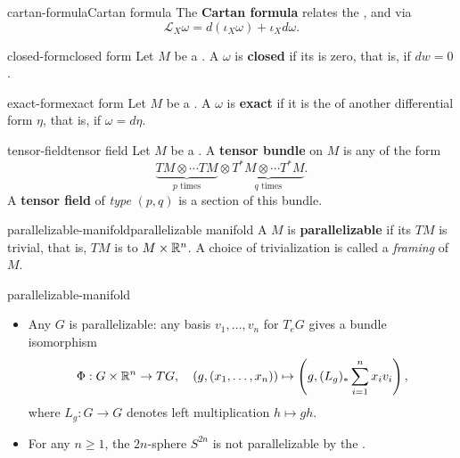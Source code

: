 \begin{topic}{cartan-formula}{Cartan formula}
    The \textbf{Cartan formula} relates the ,  and  via
    \[ \mathcal{L}_X \omega = d(\iota_X \omega) + \iota_X d \omega . \]
\end{topic}

\begin{topic}{closed-form}{closed form}
    Let $M$ be a . A  $\omega$ is \textbf{closed} if its  is zero, that is, if $dw = 0$.
\end{topic}

\begin{topic}{exact-form}{exact form}
    Let $M$ be a . A  $\omega$ is \textbf{exact} if it is the  of another differential form $\eta$, that is, if $\omega = d \eta$.
\end{topic}

\begin{topic}{tensor-field}{tensor field}
    Let $M$ be a . A \textbf{tensor bundle} on $M$ is any  of the form
    \[ \underbrace{TM \otimes \cdots TM}_{p \text{ times}} \otimes \underbrace{T^*M \otimes \cdots T^*M}_{q \text{ times}} . \]
    A \textbf{tensor field} of \textit{type} $(p, q)$ is a section of this bundle.
\end{topic}

\begin{topic}{parallelizable-manifold}{parallelizable manifold}
    A  $M$ is \textbf{parallelizable} if its  $TM$ is trivial, that is, $TM$ is  to $M \times \mathbb{R}^n$. A choice of trivialization is called a \textit{framing} of $M$.
\end{topic}

\begin{example}{parallelizable-manifold}
    \begin{itemize}
        \item Any  $G$ is parallelizable: any basis $v_1, \ldots, v_n$ for $T_e G$ gives a bundle isomorphism
        \[ \Phi : G \times \mathbb{R}^n \to TG, \quad (g, (x_1, \ldots, x_n)) \mapsto \left(g, (L_g)_* \sum_{i = 1}^{n} x_i v_i \right) , \]
        where $L_g : G \to G$ denotes left multiplication $h \mapsto gh$.
        \item For any $n \ge 1$, the $2n$-sphere $S^{2n}$ is not parallelizable by the .
    \end{itemize}
\end{example}

